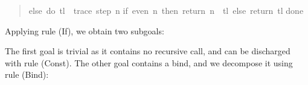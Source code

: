 \documentclass[copyright,creativecommons,sharealike]{eptcs}
\theoremstyle{remark}
\begin{document}
\begin{isabellebody}
\begin{isamarkuptxt}
\begin{quote}
{else\ do\ tl\ {\isasymleftarrow}\ trace\ {\isacharparenleft}step\ n{\isacharparenright}{\isacharsemicolon}\isanewline
{}if\ even\ n\ then\ return\ {\isacharparenleft}n\ {\isacharhash}\ tl{\isacharparenright}\ else\ return\ tl{\isacharparenright}\isanewline
{}done{\isacharparenright}}\end{quote}
Applying rule {\sc (If)}, we obtain two subgoals:\end{isamarkuptxt}\isamarkuptrue \begin{isamarkuptxt}\begin{quote}\parskip=0pt\end{quote}
The first goal is trivial as it contains no recursive
  call, and can be discharged with rule {\sc (Const)}. The other goal contains a
  bind, and we decompose it using rule {\sc (Bind)}:\end{isamarkuptxt}\isamarkuptrue \begin{isamarkuptxt}\begin{quote}\parskip=0pt\end{quote}

\end{isamarkuptxt}
\end{isabellebody}
\end{document}
